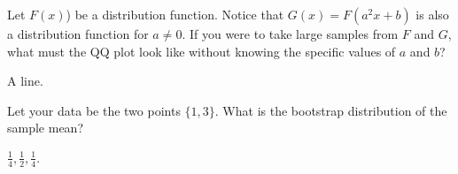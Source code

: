 \documentclass{homework}
\begin{document}
\begin{tcolorbox}[title=Question 10]
Let $F(x)$) be a distribution function. Notice that $G(x) = F(a^2x + b)$ is also a distribution function for $a \neq 0$. If you were to take large samples from $F$ and $G$, what must the QQ plot look like without knowing the specific values of $a$ and $b$?
\end{tcolorbox}

A line. 

\begin{tcolorbox}[title=Question 11]
Let your data be the two points $\{1, 3\}$.  What is the bootstrap distribution of the sample mean?
\end{tcolorbox}

$\frac{1}{4},\frac{1}{2},\frac{1}{4}$. 
\end{document}
